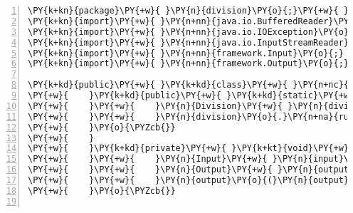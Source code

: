 \begin{Verbatim}[commandchars=\\\{\},numbers=left,firstnumber=1,stepnumber=1,frame=single,fontsize=\small]
\PY{k+kn}{package}\PY{+w}{ }\PY{n}{division}\PY{o}{;}\PY{+w}{ }\PY{c+c1}{//}\PY{+w}{ }\PY{c+c1}{このあとに改行を入れたい}
\PY{k+kn}{import}\PY{+w}{ }\PY{n+nn}{java.io.BufferedReader}\PY{o}{;}
\PY{k+kn}{import}\PY{+w}{ }\PY{n+nn}{java.io.IOException}\PY{o}{;}
\PY{k+kn}{import}\PY{+w}{ }\PY{n+nn}{java.io.InputStreamReader}\PY{o}{;}
\PY{k+kn}{import}\PY{+w}{ }\PY{n+nn}{framework.Input}\PY{o}{;}
\PY{k+kn}{import}\PY{+w}{ }\PY{n+nn}{framework.Output}\PY{o}{;}

\PY{k+kd}{public}\PY{+w}{ }\PY{k+kd}{class}\PY{+w}{ }\PY{n+nc}{Division}\PY{+w}{ }\PY{o}{\PYZob{}}
\PY{+w}{    }\PY{k+kd}{public}\PY{+w}{ }\PY{k+kd}{static}\PY{+w}{ }\PY{k+kt}{void}\PY{+w}{ }\PY{n+nf}{main}\PY{o}{(}\PY{n}{String}\PY{o}{[}\PY{o}{]}\PY{+w}{ }\PY{n}{args}\PY{o}{)}\PY{+w}{ }\PY{k+kd}{throws}\PY{+w}{ }\PY{n}{Exception}\PY{+w}{ }\PY{o}{\PYZob{}}
\PY{+w}{    }\PY{+w}{    }\PY{n}{Division}\PY{+w}{ }\PY{n}{division}\PY{+w}{ }\PY{o}{=}\PY{+w}{ }\PY{k}{new}\PY{+w}{ }\PY{n}{Division}\PY{o}{(}\PY{o}{)}\PY{o}{;}
\PY{+w}{    }\PY{+w}{    }\PY{n}{division}\PY{o}{.}\PY{n+na}{run}\PY{o}{(}\PY{o}{)}\PY{o}{;}
\PY{+w}{    }\PY{o}{\PYZcb{}}
\PY{+w}{    }
\PY{+w}{    }\PY{k+kd}{private}\PY{+w}{ }\PY{k+kt}{void}\PY{+w}{ }\PY{n+nf}{run}\PY{o}{(}\PY{o}{)}\PY{+w}{ }\PY{k+kd}{throws}\PY{+w}{ }\PY{n}{Exception}\PY{+w}{ }\PY{o}{\PYZob{}}
\PY{+w}{    }\PY{+w}{    }\PY{n}{Input}\PY{+w}{ }\PY{n}{input}\PY{+w}{ }\PY{o}{=}\PY{+w}{ }\PY{n}{input}\PY{o}{(}\PY{o}{)}\PY{o}{;}
\PY{+w}{    }\PY{+w}{    }\PY{n}{Output}\PY{+w}{ }\PY{n}{output}\PY{+w}{ }\PY{o}{=}\PY{+w}{ }\PY{n}{process}\PY{o}{(}\PY{n}{input}\PY{o}{)}\PY{o}{;}
\PY{+w}{    }\PY{+w}{    }\PY{n}{output}\PY{o}{(}\PY{n}{output}\PY{o}{)}\PY{o}{;}
\PY{+w}{    }\PY{o}{\PYZcb{}}


\end{Verbatim}
